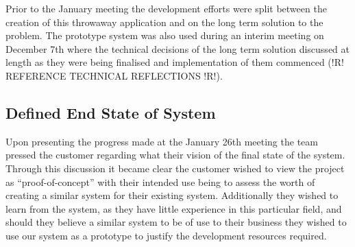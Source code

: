 \documentclass{l3proj}
\begin{document}
Prior to the January meeting the development efforts were split between the creation of this throwaway application and on the long term solution to the problem. The prototype system was also used during an interim meeting on December 7th where the technical decisions of the long term solution discussed at length as they were being finalised and implementation of them commenced (!R! REFERENCE TECHNICAL REFLECTIONS !R!).  




\subsection{Defined End State of System}
\label{sec:jandefinedstate}

Upon presenting the progress made at the January 26th meeting the team pressed the customer regarding what their vision of the final state of the system. Through this discussion it became clear the customer wished to view the project as “proof-of-concept” with their intended use being to assess the worth of creating a similar system for their existing system. Additionally they wished to learn from the system, as they have little experience in this particular field, and should they believe a similar system to be of use to their business they wished to use our system as a prototype to justify the development resources required. 
\end{document}
